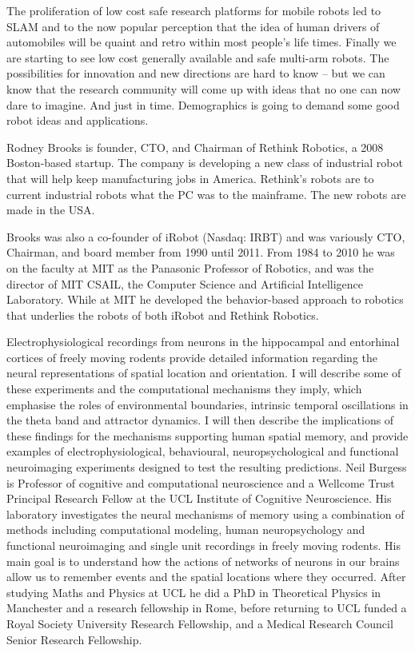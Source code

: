 {
The proliferation of low cost safe research platforms for mobile robots led to SLAM and to the now popular perception that the idea of human drivers of automobiles will be quaint and retro within most people's life times. Finally we are starting to see low cost generally available and safe multi-arm robots. The possibilities for innovation and new directions are hard to know -- but we can know that the research community will come up with ideas that no one can now dare to imagine. And just in time. Demographics is going to demand some good robot ideas and applications.
}{
Rodney Brooks is founder, CTO, and Chairman of Rethink Robotics, a 2008 Boston-based startup. The company is developing a new class of industrial robot that will help keep manufacturing jobs in America. Rethink's robots are to current industrial robots what the PC was to the mainframe.  The new robots are made in the USA.

Brooks was also a co-founder of iRobot (Nasdaq: IRBT) and was variously CTO, Chairman, and board member from 1990 until 2011. From 1984 to 2010 he was on the faculty at MIT as the Panasonic Professor of Robotics, and was the director of MIT CSAIL, the Computer Science and Artificial Intelligence Laboratory.  While at MIT he developed the behavior-based approach to robotics that underlies the robots of both iRobot and Rethink Robotics.
}

{
Electrophysiological recordings from neurons in the hippocampal and entorhinal cortices of freely moving rodents provide detailed information regarding the neural representations of spatial location and orientation. I will describe some of these experiments and the computational mechanisms they imply, which emphasise the roles of environmental boundaries, intrinsic temporal oscillations in the theta band and attractor dynamics. I will then describe the implications of these findings for the mechanisms supporting human spatial memory, and provide examples of electrophysiological, behavioural, neuropsychological and functional neuroimaging experiments designed to test the resulting predictions.
}{
Neil Burgess is Professor of cognitive and computational neuroscience and a Wellcome Trust Principal Research Fellow at the UCL Institute of Cognitive Neuroscience. His laboratory investigates the neural mechanisms of memory using a combination of methods including computational modeling, human neuropsychology and functional neuroimaging and single unit recordings in freely moving rodents. His main goal is to understand how the actions of networks of neurons in our brains allow us to remember events and the spatial locations where they occurred. After studying Maths and Physics at UCL he did a PhD in Theoretical Physics in Manchester and a research fellowship in Rome, before returning to UCL funded a Royal Society University Research Fellowship, and a Medical Research Council Senior Research Fellowship. 
}


